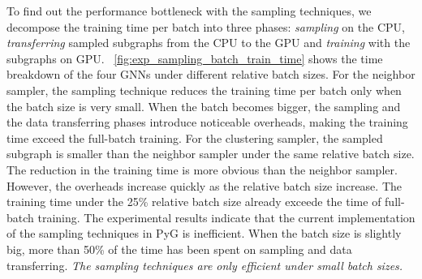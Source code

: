 To find out the performance bottleneck with the sampling techniques, we decompose the training time per batch into three phases: \emph{sampling} on the CPU, \emph{transferring} sampled subgraphs from the CPU to the GPU and \emph{training} with the subgraphs on GPU.
\figurename~\ref{fig:exp_sampling_batch_train_time} shows the time breakdown of the four GNNs under different relative batch sizes.
For the neighbor sampler, the sampling technique reduces the training time per batch only when the batch size is very small.
When the batch becomes bigger, the sampling and the data transferring phases introduce noticeable overheads, making the training time exceed the full-batch training.
For the clustering sampler, the sampled subgraph is smaller than the neighbor sampler under the same relative batch size.
The reduction in the training time is more obvious than the neighbor sampler.
However, the overheads increase quickly as the relative batch size increase.
The training time under the 25\% relative batch size already exceede the time of full-batch training.
The experimental results indicate that the current implementation of the sampling techniques in PyG is inefficient.
When the batch size is slightly big, more than 50\% of the time has been spent on sampling and data transferring.
\emph{The sampling techniques are only efficient under small batch sizes.}

